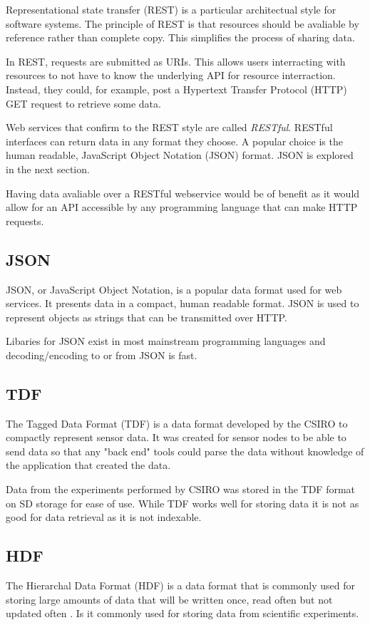 Representational state transfer (REST) is a particular architectual style for software systems. The principle of REST is that resources should be avaliable by reference rather than complete copy. This simplifies the process of sharing data. 

In REST, requests are submitted as URIs. This allows users interracting with resources to not have to know the underlying API for resource interraction. Instead, they could, for example, post a Hypertext Transfer Protocol (HTTP) GET request to retrieve some data. 

Web services that confirm to the REST style are called \textit{RESTful}. RESTful interfaces can return data in any format they choose. A popular choice is the human readable, JavaScript Object Notation (JSON) format. JSON is explored in the next section.

Having data avaliable over a RESTful webservice would be of benefit as it would allow for an API accessible by any programming language that can make HTTP requests.

\subsection{JSON}

JSON, or JavaScript Object Notation, is a popular data format used for web services. It presents data in a compact, human readable format. JSON is used to represent objects as strings that can be transmitted over HTTP. 

Libaries for JSON exist in most mainstream programming languages and decoding/encoding to or from JSON is fast.

\subsection{TDF}
The Tagged Data Format (TDF) is a data format developed by the CSIRO to compactly represent sensor data. It was created for sensor nodes to be able to send data so that any "back end" tools could parse the data without knowledge of the application that created the data. \cite{corke2010environmental}

Data from the experiments performed by CSIRO was stored in the TDF format on SD storage for ease of use. While TDF works well for storing data it is not as good for data retrieval as it is not indexable. 

\subsection{HDF}
The Hierarchal Data Format (HDF) is a data format that is commonly used for storing large amounts of data that will be written once, read often but not updated often \cite{hdf2014hierarchical}. Is it commonly used for storing data from scientific experiments. 

